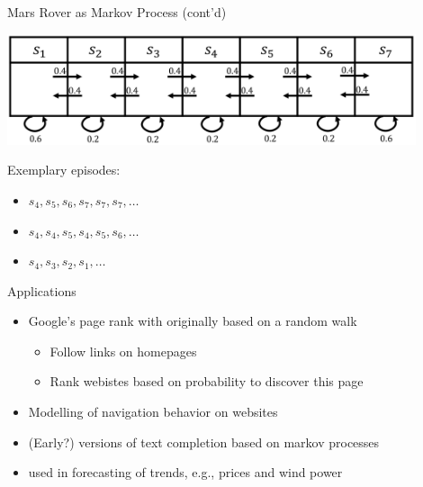 \begin{frame}[c]{Mars Rover as Markov Process (cont'd)}
	
	\begin{center}
	\includegraphics[width=0.9\textwidth]{images/mars_rover_markov_process_2.png}
	\end{center}
	
	\bigskip
	Exemplary episodes:
	\begin{itemize}
		\item $s_4, s_5, s_6, s_7, s_7, s_7, \ldots$
		\item $s_4, s_4, s_5, s_4, s_5, s_6, \ldots$
		\item $s_4, s_3, s_2, s_1, \ldots$
	\end{itemize}
	
\end{frame}
\begin{frame}[c]{Applications}

	\begin{itemize}
		\item Google's page rank with originally based on a random walk 
		\begin{itemize}
			\item Follow links on homepages
			\item Rank webistes based on probability to discover this page
		\end{itemize}
		\pause
		\smallskip
		\item Modelling of navigation behavior on websites
		\pause
		\medskip
		\item (Early?) versions of text completion based on markov processes
		\pause
		\medskip
		\item used in forecasting of trends, e.g., prices and wind power
	\end{itemize}	
	
\end{frame}

